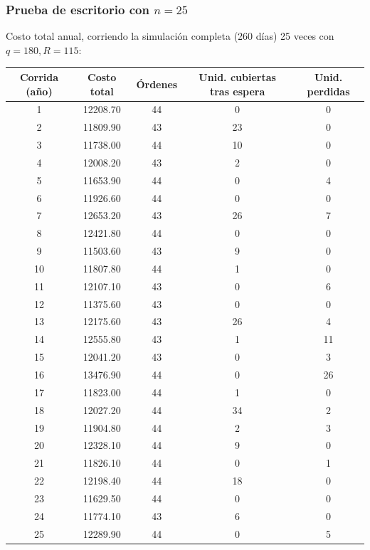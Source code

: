 \documentclass[12pt, a4paper]{article}
\begin{document}
\subsubsection{\texorpdfstring{Prueba de escritorio con $n=25$}{Prueba de escritorio con n=25}}

Costo total anual, corriendo la simulación completa (260 días) 25 veces con $q=180,R=115$:

\begin{center}
\small
\begin{tabular}{ccccc}
\toprule
Corrida (año) & Costo total & Órdenes & Unid. cubiertas tras espera & Unid. perdidas \\
\midrule
1  & 12208.70 & 44 & 0  & 0  \\
2  & 11809.90 & 43 & 23 & 0  \\
3  & 11738.00 & 44 & 10 & 0  \\
4  & 12008.20 & 43 & 2  & 0  \\
5  & 11653.90 & 44 & 0  & 4  \\
6  & 11926.60 & 44 & 0  & 0  \\
7  & 12653.20 & 43 & 26 & 7  \\
8  & 12421.80 & 44 & 0  & 0  \\
9  & 11503.60 & 43 & 9  & 0  \\
10 & 11807.80 & 44 & 1  & 0  \\
11 & 12107.10 & 43 & 0  & 6  \\
12 & 11375.60 & 43 & 0  & 0  \\
13 & 12175.60 & 43 & 26 & 4  \\
14 & 12555.80 & 43 & 1  & 11 \\
15 & 12041.20 & 43 & 0  & 3  \\
16 & 13476.90 & 44 & 0  & 26 \\
17 & 11823.00 & 44 & 1  & 0  \\
18 & 12027.20 & 44 & 34 & 2  \\
19 & 11904.80 & 44 & 2  & 3  \\
20 & 12328.10 & 44 & 9  & 0  \\
21 & 11826.10 & 44 & 0  & 1  \\
22 & 12198.40 & 44 & 18 & 0  \\
23 & 11629.50 & 44 & 0  & 0  \\
24 & 11774.10 & 43 & 6  & 0  \\
25 & 12289.90 & 44 & 0  & 5  \\
\bottomrule
\end{tabular}
\end{center}
\end{document}
